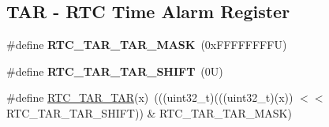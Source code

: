 \subsection*{T\+AR -\/ R\+TC Time Alarm Register}
\begin{DoxyCompactItemize}
\item 
\mbox{\label{group___r_t_c___register___masks_ga649a76416ad00079054bd866565dada2}} 
\#define {\bfseries R\+T\+C\+\_\+\+T\+A\+R\+\_\+\+T\+A\+R\+\_\+\+M\+A\+SK}~(0x\+F\+F\+F\+F\+F\+F\+F\+F\+U)
\item 
\mbox{\label{group___r_t_c___register___masks_ga9ec8791d91dc36f0f59a7705988f7278}} 
\#define {\bfseries R\+T\+C\+\_\+\+T\+A\+R\+\_\+\+T\+A\+R\+\_\+\+S\+H\+I\+FT}~(0\+U)
\item 
\#define \mbox{\hyperlink{group___r_t_c___register___masks_ga02ce5bc2603bebe1356ce961142f6700}{R\+T\+C\+\_\+\+T\+A\+R\+\_\+\+T\+AR}}(x)~(((uint32\+\_\+t)(((uint32\+\_\+t)(x)) $<$$<$ R\+T\+C\+\_\+\+T\+A\+R\+\_\+\+T\+A\+R\+\_\+\+S\+H\+I\+FT)) \& R\+T\+C\+\_\+\+T\+A\+R\+\_\+\+T\+A\+R\+\_\+\+M\+A\+SK)
\end{DoxyCompactItemize}
